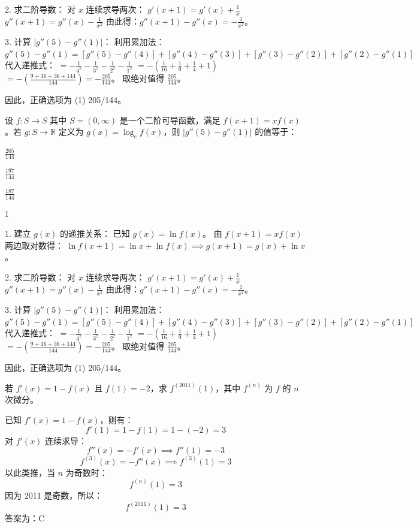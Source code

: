 \begin{questions}
\begin{solution}
2. 求二阶导数：
对 $x$ 连续求导两次：
$g'(x+1) = g'(x) + \frac{1}{x}$
$g''(x+1) = g''(x) - \frac{1}{x^2}$
由此得：$g''(x+1) - g''(x) = -\frac{1}{x^2}$。

3. 计算 $|g''(5) - g''(1)|$：
利用累加法：
$g''(5) - g''(1) = [g''(5) - g''(4)] + [g''(4) - g''(3)] + [g''(3) - g''(2)] + [g''(2) - g''(1)]$
代入递推式：
$= -\frac{1}{4^2} - \frac{1}{3^2} - \frac{1}{2^2} - \frac{1}{1^2}$
$= -(\frac{1}{16} + \frac{1}{9} + \frac{1}{4} + 1)$
$= -(\frac{9 + 16 + 36 + 144}{144}) = -\frac{205}{144}$。
取绝对值得 $\frac{205}{144}$。

因此，正确选项为 (1) 205/144。
\end{solution}

\question 
设 $f : S \to S$ 其中 $S = (0, \infty)$ 是一个二阶可导函数，满足 $f(x+1) = xf(x)$。若 $g : S \to \mathbb{R}$ 定义为 $g(x) = \log_e f(x)$，则 $|g''(5) - g''(1)|$ 的值等于：
\begin{choices}
    \item $\frac{205}{144}$
    \item $\frac{197}{144}$
    \item $\frac{187}{144}$
    \item 1
\end{choices}

\begin{solution}
1. 建立 $g(x)$ 的递推关系：
已知 $g(x) = \ln f(x)$。
由 $f(x+1) = xf(x)$ 两边取对数得：
$\ln f(x+1) = \ln x + \ln f(x) \implies g(x+1) = g(x) + \ln x$。

2. 求二阶导数：
对 $x$ 连续求导两次：
$g'(x+1) = g'(x) + \frac{1}{x}$
$g''(x+1) = g''(x) - \frac{1}{x^2}$
由此得：$g''(x+1) - g''(x) = -\frac{1}{x^2}$。

3. 计算 $|g''(5) - g''(1)|$：
利用累加法：
$g''(5) - g''(1) = [g''(5) - g''(4)] + [g''(4) - g''(3)] + [g''(3) - g''(2)] + [g''(2) - g''(1)]$
代入递推式：
$= -\frac{1}{4^2} - \frac{1}{3^2} - \frac{1}{2^2} - \frac{1}{1^2}$
$= -(\frac{1}{16} + \frac{1}{9} + \frac{1}{4} + 1)$
$= -(\frac{9 + 16 + 36 + 144}{144}) = -\frac{205}{144}$。
取绝对值得 $\frac{205}{144}$。

因此，正确选项为 (1) 205/144。
\end{solution}

    \question 若 $f'(x) = 1 - f(x)$ 且 $f(1) = -2$，求 $f^{(2011)}(1)$，其中 $f^{(n)}$ 为 $f$ 的 $n$ 次微分。

\begin{solution}
已知 $f'(x) = 1 - f(x)$，则有：
\[
f'(1) = 1 - f(1) = 1 - (-2) = 3
\]
对 $f'(x)$ 连续求导：
\[
f''(x) = -f'(x) \implies f''(1) = -3
\]
\[
f^{(3)}(x) = -f''(x) \implies f^{(3)}(1) = 3
\]
以此类推，当 $n$ 为奇数时：
\[
f^{(n)}(1) = 3
\]
因为 2011 是奇数，所以：
\[
f^{(2011)}(1) = 3
\]
答案为：C
\end{solution}


\end{questions}
